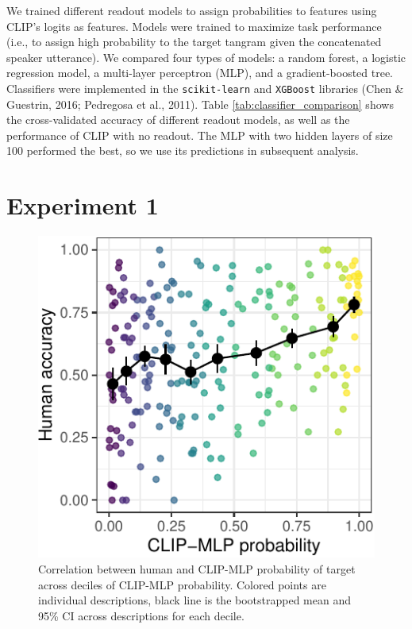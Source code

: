 \documentclass[10pt, letterpaper]{article}
\begin{document}
We trained different readout models to assign probabilities to features
using CLIP's logits as features. Models were trained to maximize task
performance (i.e., to assign high probability to the target tangram
given the concatenated speaker utterance). We compared four types of
models: a random forest, a logistic regression model, a multi-layer
perceptron (MLP), and a gradient-boosted tree. Classifiers were
implemented in the \texttt{scikit-learn} and \texttt{XGBoost} libraries
(Chen \& Guestrin, 2016; Pedregosa et al., 2011). Table
\ref{tab:classifier_comparison} shows the cross-validated accuracy of
different readout models, as well as the performance of CLIP with no
readout. The MLP with two hidden layers of size 100 performed the best,
so we use its predictions in subsequent analysis.

\section{Experiment 1}\label{experiment-1}

\begin{CodeChunk}
\begin{figure}[t]

{\centering \includegraphics[width=0.7\linewidth]{figs/fig-calibration-1} 

}

\caption[Correlation between human and CLIP-MLP probability of target across deciles of CLIP-MLP probability]{Correlation between human and CLIP-MLP probability of target across deciles of CLIP-MLP probability. Colored points are individual descriptions, black line is the bootstrapped mean and 95\% CI across descriptions for each decile. \label{calibration}}\label{fig:fig-calibration}
\end{figure}
\end{CodeChunk}
\end{document}
